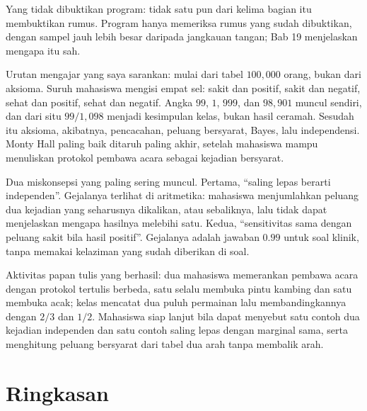 Yang tidak dibuktikan program: tidak satu pun dari kelima bagian itu membuktikan rumus.
Program hanya memeriksa rumus yang sudah dibuktikan, dengan sampel jauh lebih besar
daripada jangkauan tangan; Bab 19 menjelaskan mengapa itu sah.

\begin{untukdosen}
Urutan mengajar yang saya sarankan: mulai dari tabel $100{,}000$ orang, bukan dari
aksioma. Suruh mahasiswa mengisi empat sel: sakit dan positif, sakit dan negatif, sehat
dan positif, sehat dan negatif. Angka $99$, $1$, $999$, dan $98{,}901$ muncul sendiri,
dan dari situ $99/1{,}098$ menjadi kesimpulan kelas, bukan hasil ceramah. Sesudah itu
aksioma, akibatnya, pencacahan, peluang bersyarat, Bayes, lalu independensi. Monty Hall
paling baik ditaruh paling akhir, setelah mahasiswa mampu menuliskan protokol pembawa
acara sebagai kejadian bersyarat.

Dua miskonsepsi yang paling sering muncul. Pertama, ``saling lepas berarti independen''.
Gejalanya terlihat di aritmetika: mahasiswa menjumlahkan peluang dua kejadian yang
seharusnya dikalikan, atau sebaliknya, lalu tidak dapat menjelaskan mengapa hasilnya
melebihi satu. Kedua, ``sensitivitas sama dengan peluang sakit bila hasil positif''.
Gejalanya adalah jawaban $0.99$ untuk soal klinik, tanpa memakai kelaziman yang sudah
diberikan di soal.

Aktivitas papan tulis yang berhasil: dua mahasiswa memerankan pembawa acara dengan
protokol tertulis berbeda, satu selalu membuka pintu kambing dan satu membuka acak; kelas
mencatat dua puluh permainan lalu membandingkannya dengan $2/3$ dan $1/2$. Mahasiswa siap
lanjut bila dapat menyebut satu contoh dua kejadian independen dan satu contoh saling
lepas dengan marginal sama, serta menghitung peluang bersyarat dari tabel dua arah tanpa
membalik arah.
\end{untukdosen}

\section{Ringkasan}

